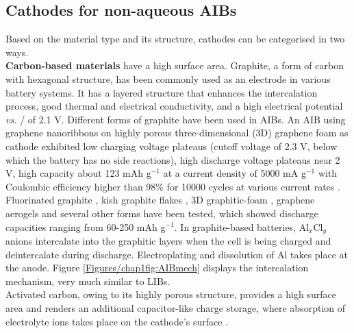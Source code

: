 \subsection{Cathodes for non-aqueous AIBs}
Based on the material type and its structure, cathodes can be categorised in two ways.\\
\textbf{Carbon-based materials} have a high surface area. Graphite, a form of carbon with hexagonal structure, has been commonly used as an electrode in various battery systems. It has a layered structure that enhances the intercalation process, good thermal and electrical conductivity, and a high electrical potential \textit{vs.} / of 2.1 V. Different forms of graphite have been used in AIBs. An AIB using graphene nanoribbons on highly porous three-dimensional (3D) graphene foam as cathode exhibited low charging voltage plateaus (cutoff voltage of 2.3 V, below which the battery has no side reactions), high discharge voltage plateaus near 2 V, high capacity about 123 mAh g$^{-1}$ at a current density of 5000 mA g$^{-1}$ with Coulombic efficiency higher than 98\% for 10000 cycles at various current rates \cite{yu_graphene_2017}. Fluorinated graphite \cite{rani_fluorinated_2013}, kish graphite flakes \cite{wang_kish_2017}, 3D graphitic-foam \cite{wu_3d_2016}, graphene aerogels\cite{huang_graphene_2019} and several other forms have been tested, which showed discharge capacities ranging from 60-250 mAh g$^{-1}$. In graphite-based batteries, Al$_x$Cl$_y$ anions intercalate into the graphitic layers when the cell is being charged and deintercalate during discharge. Electroplating and dissolution of Al takes place at the anode. Figure \ref{Figures/chap1fig:AIBmech} displays the intercalation mechanism, very much similar to LIBs.\\
Activated carbon, owing to its highly porous structure, provides a high surface area and renders an additional capacitor-like charge storage, where absorption of electrolyte ions takes place on the cathode's surface \cite{eliad_ion_2001, zhu_carbon-based_2011}.\\
